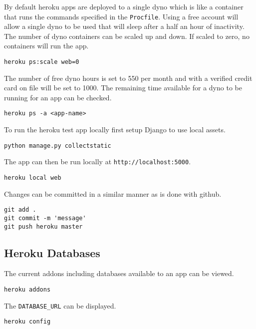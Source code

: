 \documentclass[]{book}
\begin{document}
By default heroku apps are deployed to a single dyno which is like a container that runs the commands specified in the \texttt{Procfile}. Using a free account will allow a single dyno to be used that will sleep after a half an hour of inactivity. The number of dyno containers can be scaled up and down. If scaled to zero, no containers will run the app.

\begin{verbatim}
heroku ps:scale web=0
\end{verbatim}

The number of free dyno hours is set to 550 per month and with a verified credit card on file will be set to 1000. The remaining time available for a dyno to be running for an app can be checked.

\begin{verbatim}
heroku ps -a <app-name>
\end{verbatim}

To run the heroku test app locally first setup Django to use local assets.

\begin{verbatim}
python manage.py collectstatic
\end{verbatim}

The app can then be run locally at \texttt{http://localhost:5000}.

\begin{verbatim}
heroku local web
\end{verbatim}

Changes can be committed in a similar manner as is done with github.

\begin{verbatim}
git add .
git commit -m 'message'
git push heroku master
\end{verbatim}

\hypertarget{heroku-databases}{%
\subsection{Heroku Databases}\label{heroku-databases}}

The current addons including databases available to an app can be viewed.

\begin{verbatim}
heroku addons
\end{verbatim}

The \texttt{DATABASE\_URL} can be displayed.

\begin{verbatim}
heroku config
\end{verbatim}
\end{document}
